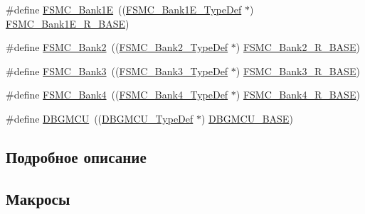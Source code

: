 \begin{DoxyCompactItemize}
\item 
\#define \mbox{\hyperlink{group___peripheral__declaration_ga422986101f42a8811ae89ac69deb2759}{F\+S\+M\+C\+\_\+\+Bank1E}}~((\mbox{\hyperlink{struct_f_s_m_c___bank1_e___type_def}{F\+S\+M\+C\+\_\+\+Bank1\+E\+\_\+\+Type\+Def}} $\ast$) \mbox{\hyperlink{group___peripheral__memory__map_gaea182589c84aee30b7f735474d8774e2}{F\+S\+M\+C\+\_\+\+Bank1\+E\+\_\+\+R\+\_\+\+B\+A\+SE}})
\item 
\#define \mbox{\hyperlink{group___peripheral__declaration_gabb3dfb5e88694aa2983ecabd33a55e0a}{F\+S\+M\+C\+\_\+\+Bank2}}~((\mbox{\hyperlink{struct_f_s_m_c___bank2___type_def}{F\+S\+M\+C\+\_\+\+Bank2\+\_\+\+Type\+Def}} $\ast$) \mbox{\hyperlink{group___peripheral__memory__map_ga3cb46d62f4f6458e186a5a4c753e4918}{F\+S\+M\+C\+\_\+\+Bank2\+\_\+\+R\+\_\+\+B\+A\+SE}})
\item 
\#define \mbox{\hyperlink{group___peripheral__declaration_ga411eedc00b5b2b22b494004d4f41b736}{F\+S\+M\+C\+\_\+\+Bank3}}~((\mbox{\hyperlink{struct_f_s_m_c___bank3___type_def}{F\+S\+M\+C\+\_\+\+Bank3\+\_\+\+Type\+Def}} $\ast$) \mbox{\hyperlink{group___peripheral__memory__map_gacf056152c9e5aefcc67db78d1302c0d7}{F\+S\+M\+C\+\_\+\+Bank3\+\_\+\+R\+\_\+\+B\+A\+SE}})
\item 
\#define \mbox{\hyperlink{group___peripheral__declaration_ga5aa00e4ac522693c6a21bc23ef5a96df}{F\+S\+M\+C\+\_\+\+Bank4}}~((\mbox{\hyperlink{struct_f_s_m_c___bank4___type_def}{F\+S\+M\+C\+\_\+\+Bank4\+\_\+\+Type\+Def}} $\ast$) \mbox{\hyperlink{group___peripheral__memory__map_gaf9e5417133160b0bdd0498d982acec19}{F\+S\+M\+C\+\_\+\+Bank4\+\_\+\+R\+\_\+\+B\+A\+SE}})
\item 
\#define \mbox{\hyperlink{group___peripheral__declaration_ga92ec6d9ec2251fda7d4ce09748cd74b4}{D\+B\+G\+M\+CU}}~((\mbox{\hyperlink{struct_d_b_g_m_c_u___type_def}{D\+B\+G\+M\+C\+U\+\_\+\+Type\+Def}} $\ast$) \mbox{\hyperlink{group___peripheral__memory__map_ga4adaf4fd82ccc3a538f1f27a70cdbbef}{D\+B\+G\+M\+C\+U\+\_\+\+B\+A\+SE}})
\end{DoxyCompactItemize}


\subsection{Подробное описание}


\subsection{Макросы}
\mbox{\label{group___peripheral__declaration_ga90d2d5c526ce5c0a551f533eccbee71a}} 
